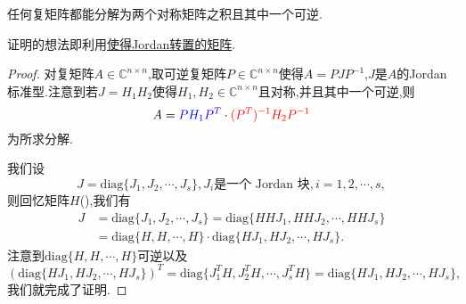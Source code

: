 \documentclass[../../main.tex]{subfiles}
\begin{document}
\begin{proposition}
任何复矩阵都能分解为两个对称矩阵之积且其中一个可逆.
\end{proposition}
\begin{note}
证明的想法即利用\hyperref[lemma:使得Jordan转置的矩阵]{使得Jordan转置的矩阵}.
\end{note}
\begin{proof}
对复矩阵\( A \in \mathbb{C}^{n \times n} \),取可逆复矩阵\( P \in \mathbb{C}^{n \times n} \)使得\( A = P J P^{-1} \),\( J \)是\( A \)的Jordan标准型.注意到若\( J = H_1 H_2 \)使得\( H_1, H_2 \in \mathbb{C}^{n \times n} \)且对称,并且其中一个可逆,则
\[
A = {\color{blue} P H_1 P^T} \cdot {\color{red} (P^T)^{-1} H_2 P^{-1}}
\]
为所求分解.

我们设
\[
J = \text{diag}\{J_1, J_2, \cdots, J_s\}, J_i \text{是一个 Jordan 块}, i = 1, 2, \cdots, s,
\]
则回忆矩阵$H$(),我们有
\[
\begin{aligned}
J &= \text{diag}\{J_1, J_2, \cdots, J_s\} = \text{diag}\{HHJ_1, HHJ_2, \cdots, HHJ_s\} \\
&= \text{diag}\{H, H, \cdots, H\} \cdot \text{diag}\{HJ_1, HJ_2, \cdots, HJ_s\}.
\end{aligned}
\]
注意到\( \text{diag}\{H, H, \cdots, H\} \)可逆以及
\[
(\text{diag}\{HJ_1, HJ_2, \cdots, HJ_s\})^T = \text{diag}\{J_1^T H, J_2^T H, \cdots, J_s^T H\} = \text{diag}\{HJ_1, HJ_2, \cdots, HJ_s\},
\]
我们就完成了证明.
\end{proof}
\end{document}
